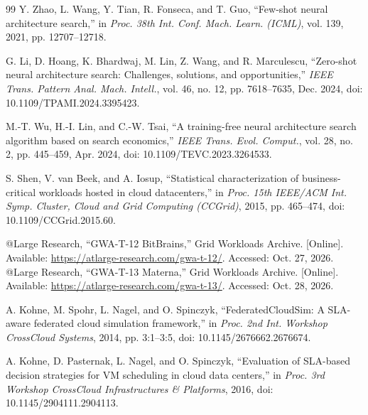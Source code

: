 \documentclass[a4paper,fleqn]{cas-sc}
\begin{document}
\begin{thebibliography}{99}
Y. Zhao, L. Wang, Y. Tian, R. Fonseca, and T. Guo, ``Few-shot neural architecture search,'' in \emph{Proc. 38th Int. Conf. Mach. Learn. (ICML)}, vol. 139, 2021, pp. 12707--12718.

G. Li, D. Hoang, K. Bhardwaj, M. Lin, Z. Wang, and R. Marculescu, ``Zero-shot neural architecture search: Challenges, solutions, and opportunities,'' \emph{IEEE Trans. Pattern Anal. Mach. Intell.}, vol. 46, no. 12, pp. 7618--7635, Dec. 2024, doi: 10.1109/TPAMI.2024.3395423.

M.-T. Wu, H.-I. Lin, and C.-W. Tsai, ``A training-free neural architecture search algorithm based on search economics,'' \emph{IEEE Trans. Evol. Comput.}, vol. 28, no. 2, pp. 445--459, Apr. 2024, doi: 10.1109/TEVC.2023.3264533.

S. Shen, V. van Beek, and A. Iosup,
``Statistical characterization of business-critical workloads hosted in
cloud datacenters,'' in \emph{Proc. 15th IEEE/ACM Int. Symp. Cluster, Cloud
and Grid Computing (CCGrid)}, 2015, pp. 465--474,
doi: 10.1109/CCGrid.2015.60.

@Large Research, ``GWA-T-12 BitBrains,''
Grid Workloads Archive. [Online]. Available:
\url{https://atlarge-research.com/gwa-t-12/}. Accessed: Oct. 27, 2026.
@Large Research, ``GWA-T-13 Materna,'' Grid Workloads
Archive. [Online]. Available: \url{https://atlarge-research.com/gwa-t-13/}.
Accessed: Oct. 28, 2026.

A. Kohne, M. Spohr, L. Nagel, and O. Spinczyk,
``FederatedCloudSim: A SLA-aware federated cloud simulation framework,'' in
\emph{Proc. 2nd Int. Workshop CrossCloud Systems}, 2014, pp. 3:1--3:5,
doi: 10.1145/2676662.2676674.

A. Kohne, D. Pasternak, L. Nagel, and O. Spinczyk,
``Evaluation of SLA-based decision strategies for VM scheduling in cloud
data centers,'' in \emph{Proc. 3rd Workshop CrossCloud Infrastructures \&
Platforms}, 2016, doi: 10.1145/2904111.2904113.
\end{thebibliography}
\end{document}
